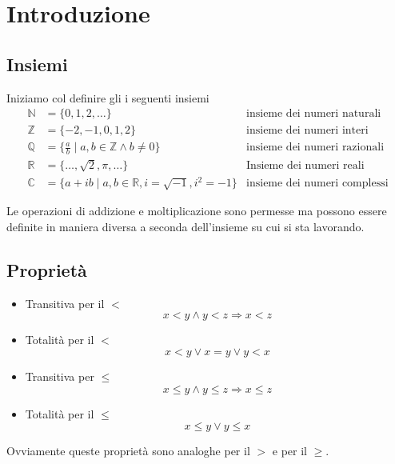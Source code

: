 \section{Introduzione}
\subsection{Insiemi}
Iniziamo col definire gli i seguenti insiemi
\begin{equation*}
	\begin{array}{lll}
		\mathbb{N} & = \{ 0, 1, 2, \dots \}
		           & \text{insieme dei numeri naturali}                              \\
		\mathbb{Z} & = \{ -2, -1, 0, 1, 2 \}
		           & \text{insieme dei numeri interi}                                \\
		\mathbb{Q} & = \{ \frac{a}{b} \mid a, b \in \mathbb{Z} \wedge b \neq 0 \}
		           & \text{insieme dei numeri razionali}                             \\
		\mathbb{R} & = \{ \dots, \sqrt{2}, \pi, \dots \}
		           & \text{Insieme dei numeri reali}                                 \\
		\mathbb{C} & = \{ a + ib \mid a, b \in \mathbb{R}, i = \sqrt{-1}, i^2 = -1\}
		           & \text{insieme dei numeri complessi}
	\end{array}
\end{equation*}

Le operazioni di addizione e moltiplicazione sono permesse ma possono essere definite
in maniera diversa a seconda dell'insieme su cui si sta lavorando.

\subsection{Propriet\`a}
\begin{itemize}
	\item Transitiva per il $<$
	      \begin{equation*}
		      x < y \wedge y < z \Rightarrow x < z
	      \end{equation*}

	\item Totalit\`a per il $<$
	      \begin{equation*}
		      x < y \vee x = y \vee y < x
	      \end{equation*}

	\item Transitiva per $\leq$
	      \begin{equation*}
		      x \leq y \wedge y \leq z \Rightarrow x \leq z
	      \end{equation*}

	\item Totalit\`a per il $\leq$
	      \begin{equation*}
		      x \leq y \vee y \leq x
	      \end{equation*}
\end{itemize}
Ovviamente queste propriet\`a sono analoghe per il $>$ e per il $\geq$.

